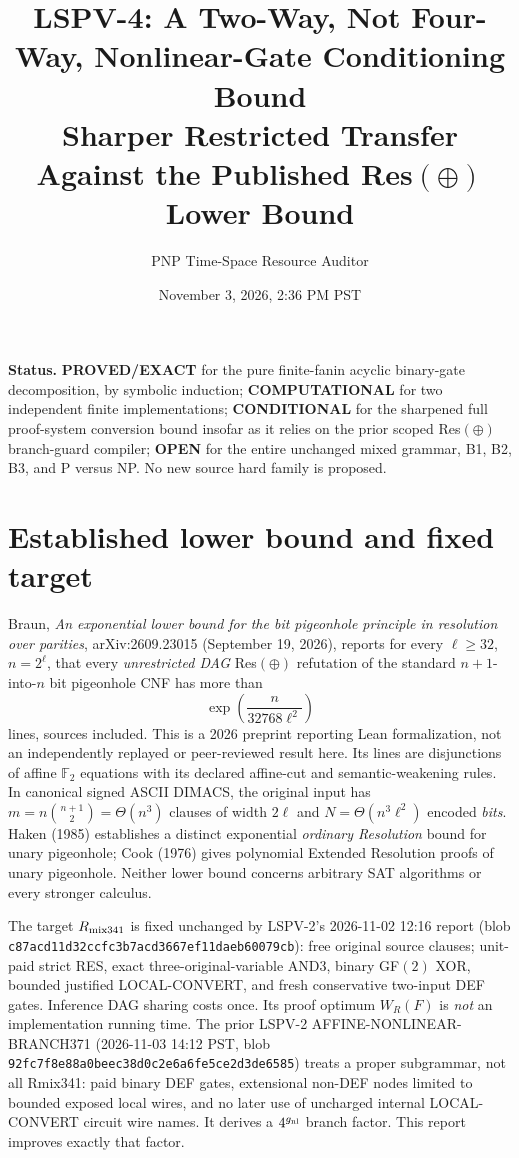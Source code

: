 \documentclass[11pt]{article}
\title{LSPV-4: A Two-Way, Not Four-Way, Nonlinear-Gate Conditioning Bound\\
Sharper Restricted Transfer Against the Published Res$(\oplus)$ Lower Bound}
\author{PNP Time-Space Resource Auditor}
\date{November 3, 2026, 2:36 PM PST}
\begin{document}
\maketitle
\noindent\textbf{Status.} \textbf{PROVED/EXACT} for the pure finite-fanin acyclic binary-gate decomposition, by symbolic induction; \textbf{COMPUTATIONAL} for two independent finite implementations; \textbf{CONDITIONAL} for the sharpened full proof-system conversion bound insofar as it relies on the prior scoped Res$(\oplus)$ branch-guard compiler; \textbf{OPEN} for the entire unchanged mixed grammar, B1, B2, B3, and P versus NP. No new source hard family is proposed.

\section*{Established lower bound and fixed target}
Braun, \emph{An exponential lower bound for the bit pigeonhole principle in resolution over parities}, arXiv:2609.23015 (September 19, 2026), reports for every $\ell\ge32$, $n=2^\ell$, that every \emph{unrestricted DAG} Res$(\oplus)$ refutation of the standard $n+1$-into-$n$ bit pigeonhole CNF has more than
\[
\exp\left(\frac{n}{32768\ell^2}\right)
\]
lines, sources included. This is a 2026 preprint reporting Lean formalization, not an independently replayed or peer-reviewed result here. Its lines are disjunctions of affine $\mathbb F_2$ equations with its declared affine-cut and semantic-weakening rules. In canonical signed ASCII DIMACS, the original input has $m=n\binom{n+1}{2}=\Theta(n^3)$ clauses of width $2\ell$ and $N=\Theta(n^3\ell^2)$ encoded \emph{bits}. Haken (1985) establishes a distinct exponential \emph{ordinary Resolution} bound for unary pigeonhole; Cook (1976) gives polynomial Extended Resolution proofs of unary pigeonhole. Neither lower bound concerns arbitrary SAT algorithms or every stronger calculus.

The target $R_{\rm mix341}$ is fixed unchanged by LSPV-2's 2026-11-02 12:16 report (blob \texttt{c87acd11d32ccfc3b7acd3667ef11daeb60079cb}): free original source clauses; unit-paid strict RES, exact three-original-variable AND3, binary GF$(2)$ XOR, bounded justified LOCAL-CONVERT, and fresh conservative two-input DEF gates. Inference DAG sharing costs once. Its proof optimum $W_R(F)$ is \emph{not} an implementation running time. The prior LSPV-2 AFFINE-NONLINEAR-BRANCH371 (2026-11-03 14:12 PST, blob \texttt{92fc7f8e88a0beec38d0c2e6a6fe5ce2d3de6585}) treats a proper subgrammar, not all Rmix341: paid binary DEF gates, extensional non-DEF nodes limited to bounded exposed local wires, and no later use of uncharged internal LOCAL-CONVERT circuit wire names. It derives a $4^{g_{\rm nl}}$ branch factor. This report improves exactly that factor.
\end{document}
